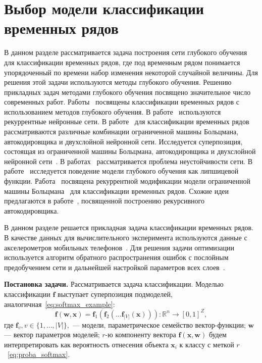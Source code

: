 \section{Выбор модели классификации временных рядов}

В данном разделе рассматривается задача построения сети глубокого обучения для классификации временных рядов, где
под временным рядом понимается упорядоченный по времени набор изменения некоторой случайной величины. Для решения этой задачи используются методы глубокого обучения. 
Решению прикладных задач методами глубокого обучения посвящено значительное число современных работ. Работы~\cite{ts1,ts2,ts3} посвящены классификации временных рядов с использованием методов глубокого обучения. В работе~\cite{ts2} используются рекуррентные нейронные сети. В работе~\cite{ts3} для классификации временных рядов рассматриваются различные комбинации ограниченной машины Больцмана, автокодировщика и двухслойной нейронной сети. Исследуется суперпозиция, состоящая из ограниченной машины Больцмана, автокодировщика и двухслойной нейронной сети~\cite{foundamentals}. В работах~\cite{stab1, stab2} рассматривается проблема неустойчивости сети. В работе~\cite{stab1} исследуется поведение модели глубокого обучения как липшицевой функции.  Работа~\cite{recrbm} посвящена рекуррентной модификации модели ограниченной машины Больцмана~\cite{rbm} для классификации временных рядов. Схожие идеи предлагаются в работе~\cite{rae}, посвященной построению рекурсивного автокодировщика.

В данном разделе решается прикладная задача классификации временных рядов. В качестве данных для вычислительного эксперимента используются данные с акселерометров мобильных телефонов~\cite{wisdm}. Для решения задачи оптимизации используется алгоритм обратного распространения ошибок с послойным предобучением сети и дальнейшей настройкой параметров всех слоев~\cite{finetuning}.

\textbf{Постановка задачи. }
Рассматривается задача классификации. 
Моделью классификации  $\mathbf{f}$ выступает суперпозиция подмоделей, аналогичная~\eqref{eq:softmax_example}:
\begin{equation}
\label{eq:wisdm_superposition}
 \mathbf{f}(\mathbf{w}, \mathbf{x}) = \mathbf{f}_1(\mathbf{f}_2(\dots \mathbf{f}_{|V|}(\mathbf{x}))): \mathbb{R}^n \to [0,1]^Z,
\end{equation}
где $\mathbf{f}_v, v \in \{1,\dots,{|V|}\},$ --- модели, параметрическое семейство вектор-функции; $\mathbf{w}$ --- вектор параметров моделей;
$r$-ю компоненту вектора $\mathbf{f}(\mathbf{x},\mathbf{w})$ будем интерпретировать как вероятность отнесения объекта $\mathbf{x}_i$ к классу с меткой $r$~\eqref{eq:proba_softmax}.

